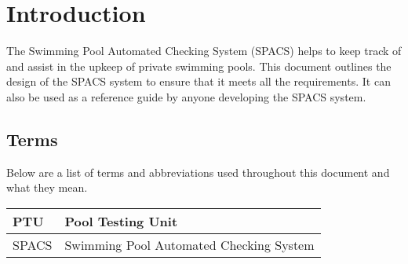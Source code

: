 \section{Introduction}

\par
The Swimming Pool Automated Checking System (SPACS) helps to keep track of and assist in the upkeep of private swimming pools. This document outlines the design of the SPACS system to ensure that it meets all the requirements. It can also be used as a reference guide by anyone developing the SPACS system.

\subsection{Terms}
\par
Below are a list of terms and abbreviations used throughout this document and what they mean.

\begin{center}
\begin{tabular}{| l | p{13cm} |}
\hline
PTU & Pool Testing Unit \\ \hline
SPACS & Swimming Pool Automated Checking System \\ \hline
\end{tabular}
\end{center}
